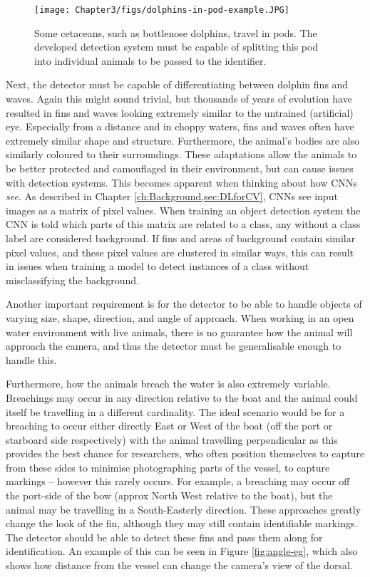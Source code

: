  \begin{figure}
 	\begin{center}
 		\texttt{[image: Chapter3/figs/dolphins-in-pod-example.JPG]}
 	\end{center}
 	\caption{Some cetaceans, such as bottlenose dolphins, travel in pods. The developed detection system must be capable of splitting this pod into individual animals to be passed to the identifier.
 	}
 	\label{fig:pod-eg}
 \end{figure}

 Next, the detector must be capable of differentiating between dolphin fins and waves. Again this might sound trivial, but thousands of years of evolution have resulted in fins and waves looking extremely similar to the untrained (artificial) eye. Especially from a distance and in choppy waters, fins and waves often have extremely similar shape and structure. Furthermore, the animal's bodies are also similarly coloured to their surroundings. These adaptations allow the animals to be better protected and camouflaged in their environment, but can cause issues with detection systems. This becomes apparent when thinking about how CNNs \textit{see}. As described in Chapter \ref{ch:Background,sec:DLforCV}, CNNs see input images as a matrix of pixel values. When training an object detection system the CNN is told which parts of this matrix are related to a class, any without a class label are considered background. If fins and areas of background contain similar pixel values, and these pixel values are clustered in similar ways, this can result in issues when training a model to detect instances of a class without misclassifying the background. 
 
 Another important requirement is for the detector to be able to handle objects of varying size, shape, direction, and angle of approach. When working in an open water environment with live animals, there is no guarantee how the animal will approach the camera, and thus the detector must be generalisable enough to handle this. 
 
 Furthermore, how the animals breach the water is also extremely variable. Breachings may occur in any direction relative to the boat and the animal could itself be travelling in a different cardinality. The ideal scenario would be for a breaching to occur either directly East or West of the boat (off the port or starboard side respectively) with the animal travelling perpendicular as this provides the best chance for researchers, who often position themselves to capture from these sides to minimise photographing parts of the vessel, to capture markings -- however this rarely occurs. For example, a breaching may occur off the port-side of the bow (approx North West relative to the boat), but the animal may be travelling in a South-Easterly direction. These approaches greatly change the look of the fin, although they may still contain identifiable markings. The detector should be able to detect these fins and pass them along for identification. An example of this can be seen in Figure \ref{fig:angle-eg}, which also shows how distance from the vessel can change the camera's view of the dorsal. 
 
